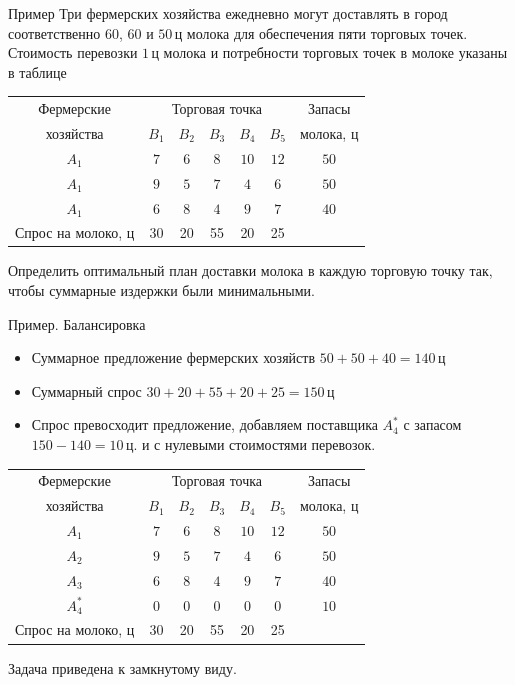 \documentclass[unicode,11pt,notheorems,xcolor=table]{beamer}
\begin{document}
\begin{frame}{Пример}{}
	Три фермерских хозяйства   ежедневно могут доставлять в город соответственно $60$, $60$ и $50$\,ц молока для обеспечения пяти торговых точек.
	Стоимость перевозки $1$\,ц молока и потребности торговых точек в молоке указаны в таблице
	
	\medskip
	{\centering
		\begin{tabular}{|c|c|c|c|c|c|c|}
			\hline
			Фермерские & \multicolumn{5}{c|}{Торговая точка} & Запасы\\
			\cline{2-6}
			хозяйства & $B_1$ &$B_2$ & $B_3$ & $B_4$ & $B_5$ & молока, ц\\
			\hline
			$A_1$& $7$ &{$6$} & {$8$} & {$10$} & {$12$} & $50$ \\
			\hline
			$A_1$& {$9$} &{$5$} & {$7$} & {$4$} & {$6$} & $50$ \\
			\hline
			$A_1$& {$6$} &{$8$} & {$4$} & {$9$} & {$7$} & $40$ \\
			\hline
			\parbox{16.5mm}{Спрос на молоко, ц} & 30 & 20 & 55 & 20 & 25 &  \\
			\hline
		\end{tabular}
		\par}
	\medskip
	Определить  оптимальный план доставки молока в каждую торговую точку так, чтобы суммарные издержки были минимальными.
\end{frame}

\begin{frame}{Пример. Балансировка}{}
	\begin{itemize}
		\item Суммарное предложение фермерских хозяйств $50+50+40=140$\,ц
		\item Суммарный спрос $30+20+55+20+25=150$\,ц
		\item  Спрос превосходит предложение, добавляем поставщика $A^*_4$ с запасом $150-140 =10$\,ц. и с нулевыми стоимостями перевозок.
		
	\end{itemize}
	
	
	\medskip
	{\centering
		\begin{tabular}{|c|c|c|c|c|c|c|}
			\hline
			Фермерские & \multicolumn{5}{c|}{Торговая точка} & Запасы\\
			\cline{2-6}
			хозяйства & $B_1$ &$B_2$ & $B_3$ & $B_4$ & $B_5$ & молока, ц\\
			\hline
			$A_1$& $7$ &{$6$} & {$8$} & {$10$} & {$12$} & $50$ \\
			\hline
			$A_2$& {$9$} &{$5$} & {$7$} & {$4$} & {$6$} & $50$ \\
			\hline
			$A_3$& {$6$} &{$8$} & {$4$} & {$9$} & {$7$} & $40$ \\
			\hline
			$A^*_4$& {0} &{0} & {0} & {0} & {0} & $10$ \\
			\hline
			\parbox{16.5mm}{Спрос на молоко, ц} & 30 & 20 & 55 & 20 & 25 &  \\
			\hline
		\end{tabular}
		\par}
	Задача приведена к замкнутому виду. 
\end{frame}
\end{document}
